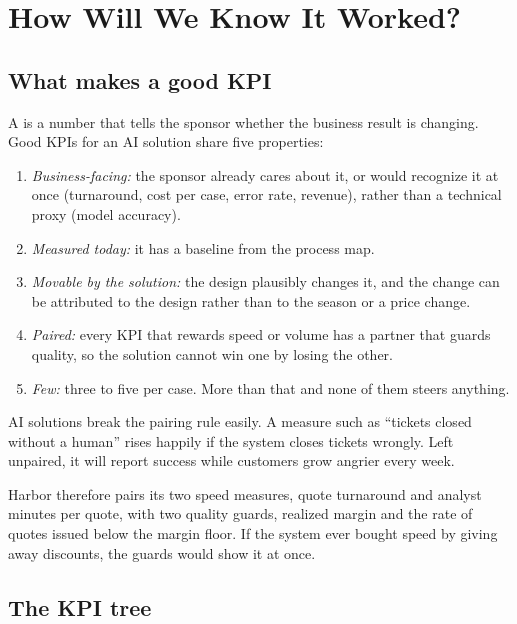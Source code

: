 \section{How Will We Know It Worked?}
\label{sec:kpis}

\subsection{What makes a good KPI}

A  is a number that tells the sponsor whether the business result is changing. Good KPIs for an AI solution share five properties:
\begin{enumerate}[itemsep=1pt]
  \item \emph{Business-facing:} the sponsor already cares about it, or would recognize it at once (turnaround, cost per case, error rate, revenue), rather than a technical proxy (model accuracy).
  \item \emph{Measured today:} it has a baseline from the process map.
  \item \emph{Movable by the solution:} the design plausibly changes it, and the change can be attributed to the design rather than to the season or a price change.
  \item \emph{Paired:} every KPI that rewards speed or volume has a partner that guards quality, so the solution cannot win one by losing the other.
  \item \emph{Few:} three to five per case. More than that and none of them steers anything.
\end{enumerate}

\begin{watchout}
AI solutions break the pairing rule easily. A measure such as ``tickets closed without a human'' rises happily if the system closes tickets wrongly. Left unpaired, it will report success while customers grow angrier every week.
\end{watchout}

Harbor therefore pairs its two speed measures, quote turnaround and analyst minutes per quote, with two quality guards, realized margin and the rate of quotes issued below the margin floor. If the system ever bought speed by giving away discounts, the guards would show it at once.

\subsection{The KPI tree}

